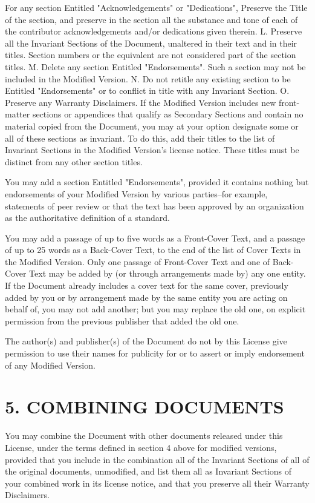 \documentclass{book}
\begin{document}
For any section Entitled "Acknowledgements" or "Dedications", Preserve
the Title of the section, and preserve in the section all the
substance and tone of each of the contributor acknowledgements and/or
dedications given therein.  L. Preserve all the Invariant Sections of
the Document, unaltered in their text and in their titles. Section
numbers or the equivalent are not considered part of the section
titles.  M. Delete any section Entitled "Endorsements". Such a section
may not be included in the Modified Version.  N. Do not retitle any
existing section to be Entitled "Endorsements" or to conflict in title
with any Invariant Section.  O. Preserve any Warranty Disclaimers.  If
the Modified Version includes new front-matter sections or appendices
that qualify as Secondary Sections and contain no material copied from
the Document, you may at your option designate some or all of these
sections as invariant. To do this, add their titles to the list of
Invariant Sections in the Modified Version's license notice. These
titles must be distinct from any other section titles.

You may add a section Entitled "Endorsements", provided it contains
nothing but endorsements of your Modified Version by various
parties--for example, statements of peer review or that the text has
been approved by an organization as the authoritative definition of a
standard.

You may add a passage of up to five words as a Front-Cover Text, and a
passage of up to 25 words as a Back-Cover Text, to the end of the list
of Cover Texts in the Modified Version. Only one passage of
Front-Cover Text and one of Back-Cover Text may be added by (or
through arrangements made by) any one entity. If the Document already
includes a cover text for the same cover, previously added by you or
by arrangement made by the same entity you are acting on behalf of,
you may not add another; but you may replace the old one, on explicit
permission from the previous publisher that added the old one.

The author(s) and publisher(s) of the Document do not by this License
give permission to use their names for publicity for or to assert or
imply endorsement of any Modified Version.

\section*{5. COMBINING DOCUMENTS}

You may combine the Document with other documents released under this
License, under the terms defined in section 4 above for modified
versions, provided that you include in the combination all of the
Invariant Sections of all of the original documents, unmodified, and
list them all as Invariant Sections of your combined work in its
license notice, and that you preserve all their Warranty Disclaimers.
\end{document}
